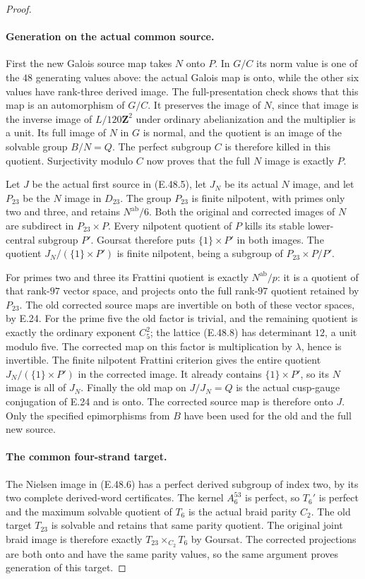 \begin{proof}
\paragraph{Generation on the actual common source.}
First the new Galois source map takes $N$ onto $P$.
In $G/C$ its norm value is one of the $48$ generating
values above: the actual Galois map is onto, while the
other six values have rank-three derived image.
The full-presentation check shows that this map is an
automorphism of $G/C$.
It preserves the image of $N$, since that image is the
inverse image of $L/120\mathbf Z^2$ under ordinary
abelianization and the multiplier is a unit.
Its full image of $N$ in $G$ is normal, and the quotient
is an image of the solvable group $B/N=Q$.
The perfect subgroup $C$ is therefore killed in this
quotient.  Surjectivity modulo $C$ now proves that the
full $N$ image is exactly $P$.

Let $J$ be the actual first source in \textup{(E.48.5)},
let $J_N$ be its actual $N$ image, and let $P_{23}$ be
the $N$ image in $D_{23}$.
The group $P_{23}$ is finite nilpotent, with primes only
two and three, and retains $N^{\mathrm{ab}}/6$.
Both the original and corrected images of $N$ are
subdirect in $P_{23}\times P$.
Every nilpotent quotient of $P$ kills its stable
lower-central subgroup $P'$.
Goursat therefore puts $\{1\}\times P'$ in both images.
The quotient $J_N/(\{1\}\times P')$ is finite nilpotent,
being a subgroup of $P_{23}\times P/P'$.

For primes two and three its Frattini quotient is exactly
$N^{\mathrm{ab}}/p$: it is a quotient of that rank-$97$
vector space, and projects onto the full rank-$97$ quotient
retained by $P_{23}$.
The old corrected source maps are invertible on both of
these vector spaces, by E.24.
For the prime five the old factor is trivial, and the
remaining quotient is exactly the ordinary exponent
$C_5^2$; the lattice \textup{(E.48.8)} has determinant
$12$, a unit modulo five.
The corrected map on this factor is multiplication by
$\lambda$, hence is invertible.
The finite nilpotent Frattini criterion gives the entire
quotient $J_N/(\{1\}\times P')$ in the corrected image.
It already contains $\{1\}\times P'$, so its $N$ image
is all of $J_N$.
Finally the old map on $J/J_N=Q$ is the actual cusp-gauge
conjugation of E.24 and is onto.
The corrected source map is therefore onto $J$.
Only the specified epimorphisms from $B$ have been used
for the old and the full new source.

\paragraph{The common four-strand target.}
The Nielsen image in \textup{(E.48.6)} has a perfect
derived subgroup of index two, by its two complete
derived-word certificates.
The kernel $A_6^{53}$ is perfect, so $T_6'$ is perfect
and the maximum solvable quotient of $T_6$ is the actual
braid parity $C_2$.
The old target $T_{23}$ is solvable and retains that
same parity quotient.
The original joint braid image is therefore exactly
$T_{23}\times_{C_2}T_6$ by Goursat.
The corrected projections are both onto and have the
same parity values, so the same argument proves generation
of this target.


\end{proof}
